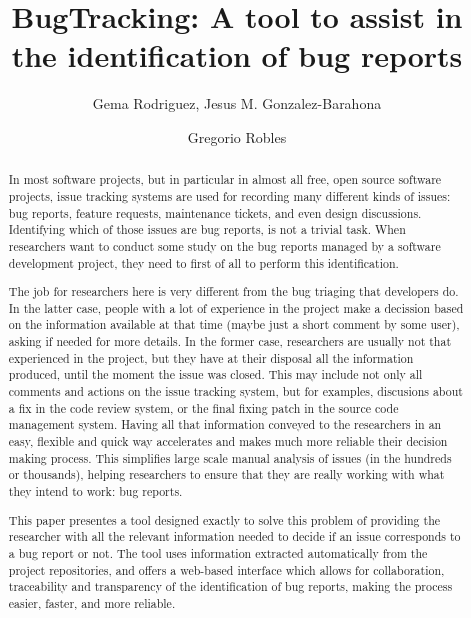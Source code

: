 \documentclass[ifip]{svmult}
\begin{document}
\title*{BugTracking: A tool to assist in the identification of bug reports}
\author{Gema Rodriguez, Jesus M. Gonzalez-Barahona \and Gregorio Robles}
%
%
\maketitle

\begin{abstract}
	In most software projects, but in particular in almost all free, open source software projects, issue tracking systems are used for recording many different kinds of issues: bug reports, feature requests, maintenance tickets, and even design discussions. Identifying which of those issues are bug reports, is not a trivial task. When researchers want to conduct some study on the bug reports managed by a software development project, they need to first of all to perform this identification.

	The job for researchers here is very different from the bug triaging that developers do. In the latter case, people with a lot of experience in the project make a decission based on the information available at that time (maybe just a short comment by some user), asking if needed for more details. In the former case, researchers are usually not that experienced in the project, but they have at their disposal all the information produced, until the moment the issue was closed. This may include not only all comments and actions on the issue tracking system, but for examples, discusions about a fix in the code review system, or the final fixing patch in the source code management system. Having all that information conveyed to the researchers in an easy, flexible and quick way accelerates and makes much more reliable their decision making process. This simplifies large scale manual analysis of issues (in the hundreds or thousands), helping researchers to ensure that they are really working with what they intend to work: bug reports.

	This paper presentes a tool designed exactly to solve this problem of providing the researcher with all the relevant information needed to decide if an issue corresponds to a bug report or not. The tool uses information extracted automatically from the project repositories, and offers a web-based interface which allows for collaboration, traceability and transparency of the identification of bug reports, making the process easier, faster, and more reliable.
\end{abstract}
\end{document}
